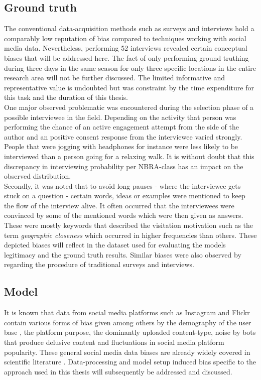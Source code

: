 \subsection{Ground truth} \label{discussion_bias_ground_truth}
The conventional data-acquisition methods such as surveys and interviews hold a comparably low reputation of bias compared to techniques working with social media data. Nevertheless, performing 52 interviews revealed certain conceptual biases that will be addressed here. The fact of only performing ground truthing during three days in the same season for only three specific locations in the entire research area will not be further discussed. The limited informative and representative value is undoubted but was constraint by the time expenditure for this task and the duration of this thesis. \\
One major observed problematic was encountered during the selection phase of a possible interviewee in the field. Depending on the activity that person was performing the chance of an active engagement attempt from the side of the author and an positive consent response from the interviewee varied strongly. People that were jogging with headphones for instance were less likely to be interviewed than a person going for a relaxing walk. It is without doubt that this discrepancy in interviewing probability per NBRA-class has an impact on the observed distribution.\\
Secondly, it was noted that to avoid long pauses - where the interviewee gets stuck on a question - certain words, ideas or examples were mentioned to keep the flow of the interview alive. It often occurred that the interviewees were convinced by some of the mentioned words which were then given as answers. These were mostly keywords that described the visitation motivation such as the term \textit{geographic closeness} which occurred in higher frequencies than others. These depicted biases will reflect in the dataset used for evaluating the models legitimacy and the ground truth results. Similar biases were also observed by \textcite{Hanemann2011, Kling2012, Tenerelli2016} regarding the procedure of traditional surveys and interviews.

\subsection{Model}
It is known that data from social media platforms such as Instagram and Flickr contain various forms of bias given among others by the demography of the user base \parencite{Heikinheimo2017}, the platform purpose, the dominantly uploaded content-type, noise by bots that produce delusive content \parencite{Edwards2014} and fluctuations in social media platform popularity. These general social media data biases are already widely covered in scientific literature \parencite{Ruths2014, Lazer2014, Zook2017}. Data-processing and model setup induced bias specific to the approach used in this thesis will subsequently be addressed and discussed. \\

